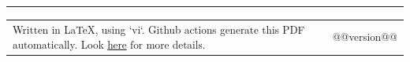 \documentclass[10pt,a4paper]{article}
\makeatletter
\newcommand{\headerrow}[2]
{\begin{tabular*}{\linewidth}{l@{\extracolsep{\fill}}r}
	#1 &
	#2 \\
\end{tabular*}}
\makeatother
\begin{document}
\hrule
\vspace{-0.4em}

\begin{description*}
  	\item
  \headerrow
    {{\textsubscript{Written in \LaTeX, using `vi`. Github actions generate this PDF automatically. Look \href{https://github.com/robert-will-brown/cv}{here} for more details.}}}
    {{\textsubscript{@@version@@}}}

\end{description*}
\end{document}
